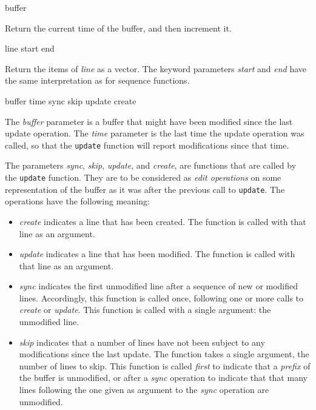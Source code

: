  {buffer}

Return the current time of the buffer, and then increment it. 

 {line \key start end}

Return the items of \textit{line} as a vector.  The keyword parameters
\textit{start} and \textit{end} have the same interpretation as for
\cl{} sequence functions.

 {buffer time sync skip update create}

The \textit{buffer} parameter is a buffer that might have been
modified since the last update operation.  The \textit{time} parameter
is the last time the update operation was called, so that the
\texttt{update} function will report modifications since that time. 

The parameters \textit{sync}, \textit{skip}, \textit{update}, and
\textit{create}, are functions that are called by the \texttt{update}
function.  They are to be considered as \emph{edit operations} on some
representation of the buffer as it was after the previous call to
\texttt{update}.  The operations have the following meaning:

\begin{itemize}
\item \textit{create} indicates a line that has been created.  The
  function is called with that line as an argument.
\item \textit{update}%
  indicates a line that has been modified.  The
  function is called with that line as an argument.
\item \textit{sync} indicates the first unmodified line after a
  sequence of new or modified lines.  Accordingly, this function is
  called once, following one or more calls to \textit{create} or
  \textit{update}.  This function is called with a single argument:
  the unmodified line.
\item \textit{skip} indicates that a number of lines have not been
  subject to any modifications since the last update.  The function
  takes a single argument, the number of lines to skip.  This function
  is called \emph{first} to indicate that a \emph{prefix} of the
  buffer is unmodified, or after a \emph{sync} operation to indicate
  that that many lines following the one given as argument to the
  \textit{sync} operation are unmodified.%
\end{itemize}

